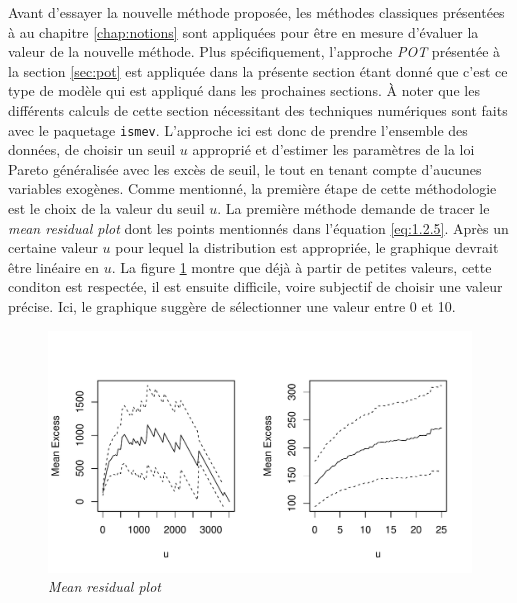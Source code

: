 Avant d'essayer la nouvelle méthode proposée, les méthodes classiques présentées à au chapitre \ref{chap:notions} sont appliquées pour être en mesure d'évaluer la valeur de la nouvelle méthode. Plus spécifiquement, l'approche \textit{POT} présentée à la section \ref{sec:pot} est appliquée dans la présente section étant donné que c'est ce type de modèle qui est appliqué dans les prochaines sections. À noter que les différents calculs de cette section nécessitant des techniques numériques sont faits avec le paquetage \texttt{ismev}. L'approche ici est donc de prendre l'ensemble des données, de choisir un seuil $u$ approprié et d'estimer les paramètres de la loi Pareto généralisée avec les excès de seuil, le tout en tenant compte d'aucunes variables exogènes. Comme mentionné, la première étape de cette méthodologie est le choix de la valeur du seuil $u$. La première méthode demande de tracer le \textit{mean residual plot} dont les points mentionnés dans l'équation \ref{eq:1.2.5}. Après un certaine valeur $u$ pour lequel la distribution est appropriée, le graphique devrait être linéaire en $u$. La figure \ref{fig:3.4} montre que déjà à partir de petites valeurs, cette conditon est respectée, il est ensuite difficile, voire subjectif de choisir une valeur précise. Ici, le graphique suggère de sélectionner une valeur entre 0 et 10.
\begin{figure}[h]
\begin{center}
\includegraphics{images/fig-009}
\end{center}
\caption{\textit{Mean residual plot}}
\label{fig:3.4}
\end{figure}

